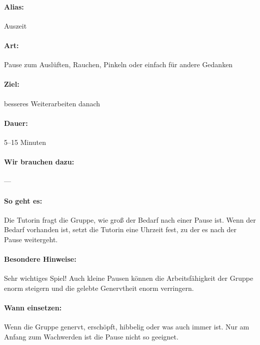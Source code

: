 \paragraph{Alias:} Auszeit
\paragraph{Art:} Pause zum Auslüften, Rauchen, Pinkeln oder einfach für andere Gedanken
\paragraph{Ziel:} besseres Weiterarbeiten danach
\paragraph{Dauer:} 5--15 Minuten
\paragraph{Wir brauchen dazu:} ---
\paragraph{So geht es:} Die Tutorin fragt die Gruppe, wie groß der Bedarf nach einer Pause ist. Wenn der Bedarf vorhanden ist, setzt die Tutorin eine Uhrzeit fest, zu der es nach der Pause weitergeht.
\paragraph{Besondere Hinweise:} Sehr wichtiges Spiel! Auch kleine Pausen können die Arbeitsfähigkeit der Gruppe enorm steigern und die gelebte Genervtheit enorm verringern.
\paragraph{Wann einsetzen:} Wenn die Gruppe genervt, erschöpft, hibbelig oder was auch immer ist. Nur am Anfang zum Wachwerden ist die Pause nicht so geeignet.

